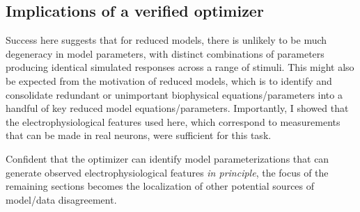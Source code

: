 \subsection{Implications of a verified optimizer}
Success here suggests that for reduced models, there is unlikely to be much degeneracy in model parameters, with distinct combinations of parameters producing identical simulated responses across a range of stimuli.
This might also be expected from the motivation of reduced models, which is to identify and consolidate redundant or unimportant biophysical equations/parameters into a handful of key reduced model equations/parameters.
Importantly, I showed that the electrophysiological features used here, which correspond to measurements that can be made in real neurons, were sufficient for this task.

Confident that the optimizer can identify model parameterizations that can generate observed electrophysiological features \emph{in principle}, the focus of the remaining sections becomes the localization of other potential sources of model/data disagreement. 
